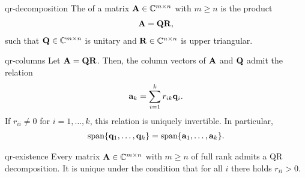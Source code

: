 \begin{Definition}{qr-decomposition}
  The  of a matrix $\mathbf A\in\mathbb C^{m\times n}$
  with $m\ge n$ is the product
  \begin{gather}
    \mathbf A = \mathbf Q\mathbf R,
  \end{gather}
  such that $\mathbf Q \in\mathbb C^{m\times n}$ is unitary and
  $\mathbf R\in \mathbb C^{n\times n}$ is upper triangular.
\end{Definition}

\begin{Lemma}{qr-columns}
  Let $\mathbf A = \mathbf Q\mathbf R$. Then, the column vectors of $\mathbf A$ and
  $\mathbf Q$ admit the relation
  \begin{gather}
    \mathbf a_k = \sum_{i=1}^k r_{ik} \mathbf q_i.
  \end{gather}
  If $r_{ii}\neq 0$ for $i=1,\dots,k$, this relation is uniquely
  invertible. In particular,
  \begin{gather}
    \operatorname{span}\{\mathbf q_1,\dots,\mathbf q_k\}
    = 
    \operatorname{span}\{\mathbf a_1,\dots,\mathbf a_k\}.
  \end{gather}
\end{Lemma}

\begin{Theorem}{qr-existence}
  Every matrix $\mathbf A\in\mathbb C^{m\times n}$ with $m\ge n$ of full rank
  admits a QR decomposition. It is unique under the condition that for
  all $i$ there holds $r_{ii} > 0$.
\end{Theorem}

